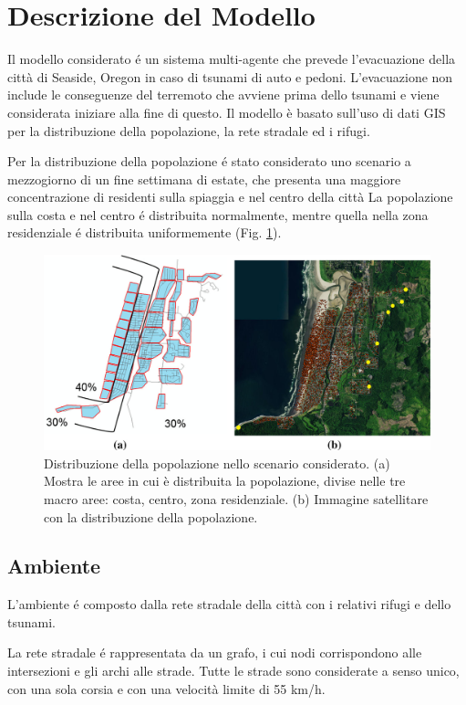 \section{Descrizione del Modello}
Il modello considerato \cite{mostafizi2019agent} é un sistema multi-agente che prevede l'evacuazione della città di Seaside, Oregon in caso di tsunami di auto e pedoni.
%
L'evacuazione non include le conseguenze del terremoto che avviene prima dello tsunami e viene considerata iniziare alla fine di questo.
Il modello è basato sull'uso di dati GIS per la distribuzione della popolazione, la rete stradale ed i rifugi.

%
Per la distribuzione della popolazione é stato considerato uno scenario a mezzogiorno di un fine settimana di estate,
che presenta una maggiore concentrazione di residenti sulla spiaggia e nel centro della città
La popolazione sulla costa e nel centro é distribuita normalmente,
mentre quella nella zona residenziale é distribuita uniformemente (Fig. \ref{fig:population}).

\begin{figure}[ht]
  \includegraphics[width=\textwidth]{images/population}
  \caption{Distribuzione della popolazione nello scenario considerato.
    (a) Mostra le aree in cui è distribuita la popolazione, divise nelle tre macro aree: costa, centro, zona residenziale.
    (b) Immagine satellitare con la distribuzione della popolazione.}
  \label{fig:population}
\end{figure}

\subsection{Ambiente}
L'ambiente é composto dalla rete stradale della città con i relativi rifugi e dello tsunami.

La rete stradale é rappresentata da un grafo, i cui nodi corrispondono alle intersezioni e gli archi alle strade.
Tutte le strade sono considerate a senso unico, con una sola corsia e con una velocità limite di 55 km/h.

